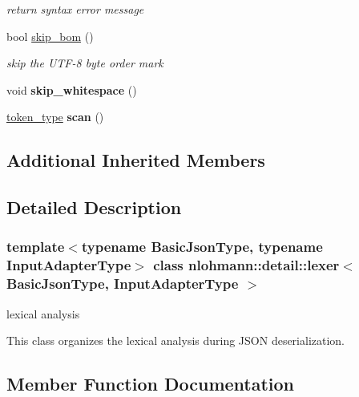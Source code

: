 \begin{DoxyCompactItemize}
\begin{DoxyCompactList}\small\item\em return syntax error message \end{DoxyCompactList}\item 
bool \hyperlink{classnlohmann_1_1detail_1_1lexer_a7cd7d55de2cd398660bc243c7229caf9}{skip\+\_\+bom} ()
\begin{DoxyCompactList}\small\item\em skip the U\+T\+F-\/8 byte order mark \end{DoxyCompactList}\item 
\mbox{\label{classnlohmann_1_1detail_1_1lexer_a449f3f3703dfbf8b757e12f002668604}} 
void {\bfseries skip\+\_\+whitespace} ()
\item 
\mbox{\label{classnlohmann_1_1detail_1_1lexer_a40320a8fef5f1f03b60c8b2f2f40af4d}} 
\hyperlink{classnlohmann_1_1detail_1_1lexer__base_aa3538cce439a2de6c7893e627b38c454}{token\+\_\+type} {\bfseries scan} ()
\end{DoxyCompactItemize}
\subsection*{Additional Inherited Members}


\subsection{Detailed Description}
\subsubsection*{template$<$typename Basic\+Json\+Type, typename Input\+Adapter\+Type$>$\newline
class nlohmann\+::detail\+::lexer$<$ Basic\+Json\+Type, Input\+Adapter\+Type $>$}

lexical analysis 

This class organizes the lexical analysis during J\+S\+ON deserialization. 

\subsection{Member Function Documentation}
\mbox{\label{classnlohmann_1_1detail_1_1lexer_ae000b7571480e528dee4b281f63d5b15}} 
